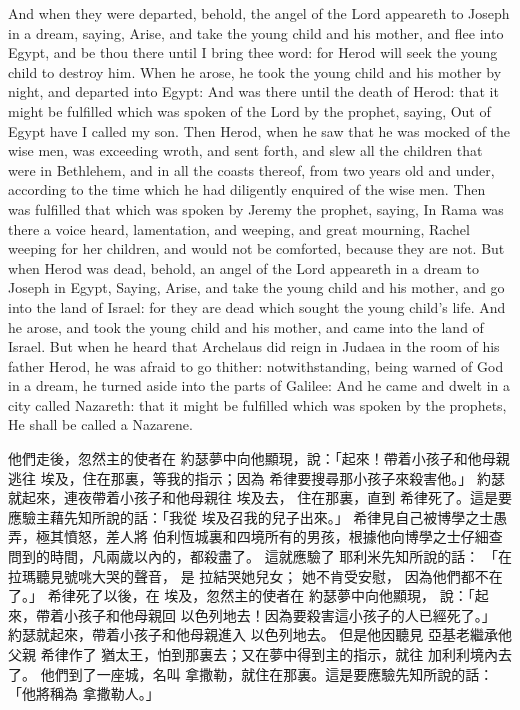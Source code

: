 And when they were departed, behold, the angel of the Lord appeareth to Joseph in a dream, saying, Arise, and take the young child and his mother, and flee into Egypt, and be thou there until I bring thee word: for Herod will seek the young child to destroy him.
When he arose, he took the young child and his mother by night, and departed into Egypt:
And was there until the death of Herod: that it might be fulfilled which was spoken of the Lord by the prophet, saying, Out of Egypt have I called my son.
Then Herod, when he saw that he was mocked of the wise men, was exceeding wroth, and sent forth, and slew all the children that were in Bethlehem, and in all the coasts thereof, from two years old and under, according to the time which he had diligently enquired of the wise men.
Then was fulfilled that which was spoken by Jeremy the prophet, saying,
In Rama was there a voice heard, lamentation, and weeping, and great mourning, Rachel weeping for her children, and would not be comforted, because they are not.
But when Herod was dead, behold, an angel of the Lord appeareth in a dream to Joseph in Egypt,
Saying, Arise, and take the young child and his mother, and go into the land of Israel: for they are dead which sought the young child's life.
And he arose, and took the young child and his mother, and came into the land of Israel.
But when he heard that Archelaus did reign in Judaea in the room of his father Herod, he was afraid to go thither: notwithstanding, being warned of God in a dream, he turned aside into the parts of Galilee:
And he came and dwelt in a city called Nazareth: that it might be fulfilled which was spoken by the prophets, He shall be called a Nazarene.

他們走後，忽然主的使者在 約瑟夢中向他顯現，說：「起來！帶着小孩子和他母親逃往 埃及，住在那裏，等我的指示；因為 希律要搜尋那小孩子來殺害他。」
約瑟就起來，連夜帶着小孩子和他母親往 埃及去，
住在那裏，直到 希律死了。這是要應驗主藉先知所說的話：「我從 埃及召我的兒子出來。」
希律見自己被博學之士愚弄，極其憤怒，差人將 伯利恆城裏和四境所有的男孩，根據他向博學之士仔細查問到的時間，凡兩歲以內的，都殺盡了。
這就應驗了 耶利米先知所說的話：
「在 拉瑪聽見號咷大哭的聲音，
是 拉結哭她兒女；
她不肯受安慰，
因為他們都不在了。」
希律死了以後，在 埃及，忽然主的使者在 約瑟夢中向他顯現，
說：「起來，帶着小孩子和他母親回 以色列地去！因為要殺害這小孩子的人已經死了。」
約瑟就起來，帶着小孩子和他母親進入 以色列地去。
但是他因聽見 亞基老繼承他父親 希律作了 猶太王，怕到那裏去；又在夢中得到主的指示，就往 加利利境內去了。
他們到了一座城，名叫 拿撒勒，就住在那裏。這是要應驗先知所說的話：「他將稱為 拿撒勒人。」 
